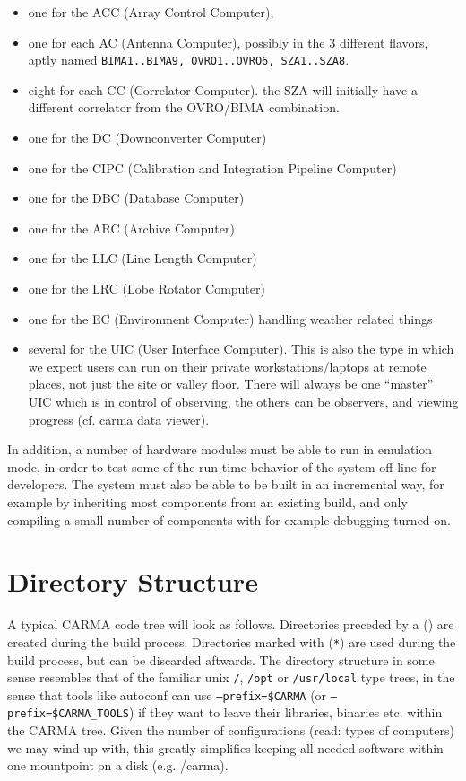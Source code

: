 \documentclass{article}
\begin{document}
\begin{itemize}
\item  
one for the ACC (Array Control Computer), 
\item 
one for each AC (Antenna Computer), 
possibly in the 3 different flavors, aptly named
{\tt BIMA1..BIMA9, OVRO1..OVRO6, SZA1..SZA8}.
\item
eight for each CC (Correlator Computer). the SZA will initially
have a different correlator from the OVRO/BIMA combination. 
\item
one for the DC (Downconverter Computer)
\item
one for the CIPC (Calibration and Integration Pipeline Computer)
\item
one for the DBC (Database Computer)
\item
one for the ARC (Archive Computer) 
\item
one for the LLC (Line Length Computer)
\item
one for the LRC (Lobe Rotator Computer)
\item
one for the EC (Environment Computer) handling weather related things
\item
several for the UIC (User Interface Computer). This is also the type
in which we expect users can run on their private workstations/laptops
at remote places, not just the site or valley floor. There will always
be one ``master'' UIC which is in control of observing, the others
can be observers, and viewing progress (cf. carma data viewer).

\end{itemize}

In addition, a number of hardware modules must be able to run
in emulation mode, in order to test some of the run-time
behavior of the system off-line for developers. 
The system must also be able to be built in an incremental way, for
example by inheriting most components from an existing build, and 
only compiling a small number of components with for example debugging
turned on.

\newpage

\section{Directory Structure}

A typical CARMA code tree will look as follows.
Directories preceded by a ({\tt *})
are created during the build process.
Directories marked with ({\tt **}) are used during the
build process, but can be discarded aftwards.
The directory structure in some
sense resembles that of the familiar unix 
{\tt /}, {\tt /opt} or {\tt /usr/local} type trees, in the 
sense that tools like autoconf can use 
{\tt --prefix=\$CARMA} (or {\tt --prefix=\$CARMA\_TOOLS})
if they want to leave their libraries, binaries etc. within the
CARMA tree. Given the number of configurations (read: types of computers)
we may wind up with, this greatly simplifies keeping all needed software
within one mountpoint on a disk (e.g. /carma).
\end{document}
